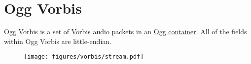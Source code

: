 
\chapter{Ogg Vorbis}
\label{vorbis}
Ogg Vorbis is a set of Vorbis audio packets
in an \hyperref[ogg]{Ogg container}.
All of the fields within Ogg Vorbis are little-endian.

\begin{figure}[h]
\texttt{[image: figures/vorbis/stream.pdf]}
\end{figure}

\clearpage

